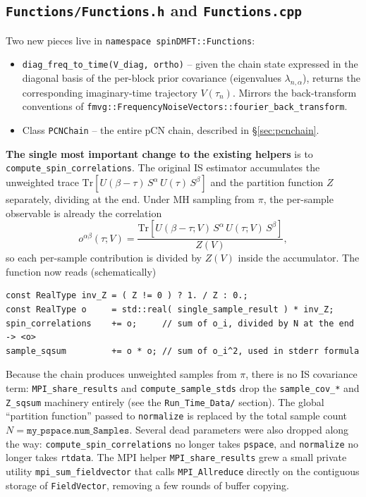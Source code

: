 \documentclass[11pt]{article}
\newcommand{\file}[1]{\texttt{#1}}
\newcommand{\code}[1]{\texttt{#1}}
\newcommand{\Tr}{\mathrm{Tr}}
\begin{document}
\subsection{\file{Functions/Functions.h} and \file{Functions.cpp}}

Two new pieces live in \code{namespace spinDMFT::Functions}:

\begin{itemize}
    \item \code{diag\_freq\_to\_time(V\_diag, ortho)} -- given the chain state
          expressed in the diagonal basis of the per-block prior covariance
          (eigenvalues $\lambda_{n,\alpha}$), returns the corresponding
          imaginary-time trajectory $V(\tau_n)$.  Mirrors the back-transform
          conventions of
          \code{fmvg::FrequencyNoiseVectors::fourier\_back\_transform}.
    \item Class \code{PCNChain} -- the entire pCN chain, described in
          \S\ref{sec:pcnchain}.
\end{itemize}

\textbf{The single most important change to the existing helpers} is to
\code{compute\_spin\_correlations}.  The original IS estimator accumulates the
unweighted trace
$\Tr[U(\beta{-}\tau)\,S^\alpha\,U(\tau)\,S^\beta]$ and the partition function $Z$
separately, dividing at the end.  Under MH sampling from $\pi$, the per-sample
observable is already the correlation
\begin{equation}
    o^{\alpha\beta}(\tau; V) =
    \frac{\Tr[U(\beta{-}\tau;V)\,S^\alpha\,U(\tau;V)\,S^\beta]}{Z(V)},
\end{equation}
so each per-sample contribution is divided by $Z(V)$ inside the accumulator.
The function now reads (schematically)
\begin{lstlisting}
const RealType inv_Z = ( Z != 0 ) ? 1. / Z : 0.;
const RealType o     = std::real( single_sample_result ) * inv_Z;
spin_correlations    += o;     // sum of o_i, divided by N at the end -> <o>
sample_sqsum         += o * o; // sum of o_i^2, used in stderr formula
\end{lstlisting}
Because the chain produces unweighted samples from $\pi$, there is no IS
covariance term: \code{MPI\_share\_results} and \code{compute\_sample\_stds} drop
the \code{sample\_cov\_*} and \code{Z\_sqsum} machinery entirely (see the
\file{Run\_Time\_Data/} section).  The global ``partition function'' passed to
\code{normalize} is replaced by the total sample count
$N = \texttt{my\_pspace.num\_Samples}$.  Several dead parameters were also
dropped along the way: \code{compute\_spin\_correlations} no longer takes
\code{pspace}, and \code{normalize} no longer takes \code{rtdata}.  The MPI
helper \code{MPI\_share\_results} grew a small private utility
\code{mpi\_sum\_fieldvector} that calls \code{MPI\_Allreduce} directly on the
contiguous storage of \code{FieldVector}, removing a few rounds of buffer
copying.
\end{document}
